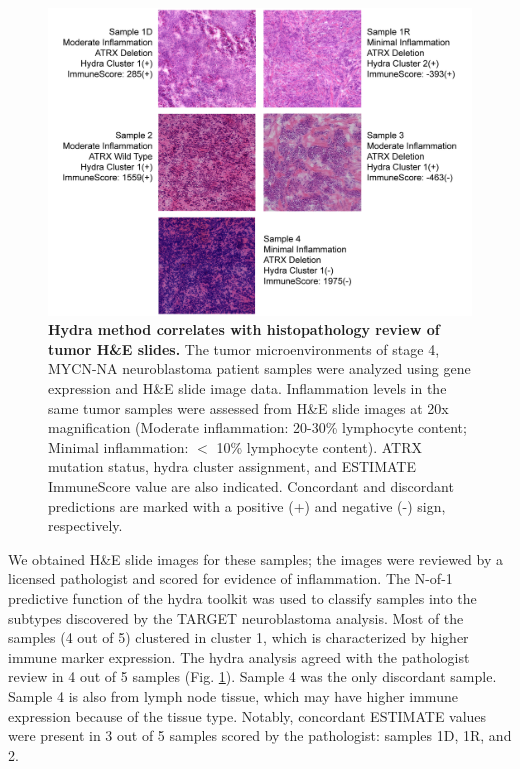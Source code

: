 \documentclass[10pt,letterpaper]{article}
\begin{document}
\begin{figure}[!h]
	\includegraphics[width=\textwidth]{img/NBL-MYCN-NA-HE-2x}
	\caption{{\bf Hydra method correlates with histopathology review of tumor H\&E slides.}
		The tumor microenvironments of stage 4, MYCN-NA neuroblastoma patient samples were analyzed using gene expression and H\&E slide image data. Inflammation levels in the same tumor samples were assessed from H\&E slide images at 20x magnification (Moderate inflammation: 20-30\% lymphocyte content; Minimal inflammation: $<$ 10\% lymphocyte content). ATRX mutation status, hydra cluster assignment, and ESTIMATE ImmuneScore value are also indicated. Concordant and discordant predictions are marked with a positive (+) and negative (-) sign, respectively.}
	\label{hefig}
\end{figure}

We obtained H\&E slide images for these samples; the images were reviewed by a licensed pathologist and scored for evidence of inflammation. The N-of-1 predictive function of the hydra toolkit was used to classify samples into the subtypes discovered by the TARGET neuroblastoma analysis. Most of the samples (4 out of 5) clustered in cluster 1, which is characterized by higher immune marker expression. The hydra analysis agreed with the pathologist review in 4 out of 5 samples (Fig. \ref{hefig}). Sample 4 was the only discordant sample. Sample 4 is also from lymph node tissue, which may have higher immune expression because of the tissue type. Notably, concordant ESTIMATE values were present in 3 out of 5 samples scored by the pathologist: samples 1D, 1R, and 2. 
\end{document}
